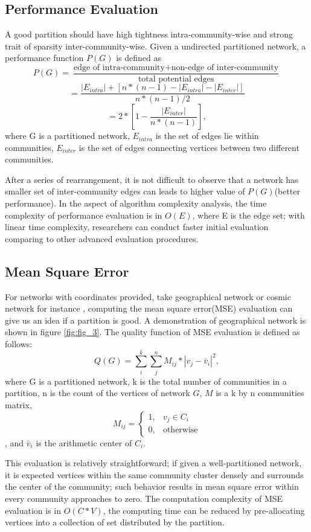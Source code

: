 \documentclass[12pt]{article}
\begin{document}
\subsection{Performance Evaluation}
A good partition should have high tightness intra-community-wise and strong trait of sparsity inter-community-wise. Given a undirected partitioned network, a performance function $P(G)$ is defined as
$$P(G) = \frac{\text{edge of intra-community} + \text{non-edge of inter-community}}{\text{total potential edges}}$$
$$=\frac{|E_{intra}| + [n*(n-1) - |E_{intra}| - |E_{inter}|]}{n*(n-1)/2}$$
$$=2*\left[ 1 - \frac{ |E_{inter}| } { n*\left( n-1 \right) }  \right],$$
where G is a partitioned network, $E_{intra}$ is the set of edges lie within communities, $E_{inter}$ is the set of edges connecting vertices between two different communities. 

\bigbreak

After a series of rearrangement, it is not difficult to observe that a network has smaller set of inter-community edges can leads to higher value of $P(G)$(better performance)\cite{7}. In the aspect of algorithm complexity analysis, the time complexity of performance evaluation is in $O(E)$, where E is the edge set; with linear time complexity, researchers can conduct faster initial evaluation comparing to other advanced evaluation procedures.

\subsection{Mean Square Error}
For networks with coordinates provided, take geographical network or cosmic network for instance \cite{9,10}, computing the mean square error(MSE) evaluation can give us an idea if a partition is good. A demonstration of geographical network is shown in figure \ref{fig:fig_3}. The quality function of MSE evaluation is defined as follows:
    $$Q(G) = \sum_{i}^{k}\sum_{j}^{n} M_{i j} * |v_{j} - \bar{v}_{i}|^{2},$$
where G is a partitioned network, k is the total number of communities in a partition, n is the count of the vertices of network $G$, $M$ is a k by n communities matrix, \[
  M_{ij} = 
  \begin{cases}
    1, &  v_{j} \in C_i\\
    0, & \text{otherwise}
  \end{cases}
\]
, and $\bar{v}_{i}$ is the arithmetic center of $C_i$. 

\bigbreak

This evaluation is relatively straightforward; if given a well-partitioned network, it is expected vertices within the same community cluster densely and surrounds the center of the community; such behavior results in mean square error within every community approaches to zero. The computation complexity of MSE evaluation is in $O(C*V)$, the computing time can be reduced by pre-allocating vertices into a collection of set distributed by the partition.
\end{document}
